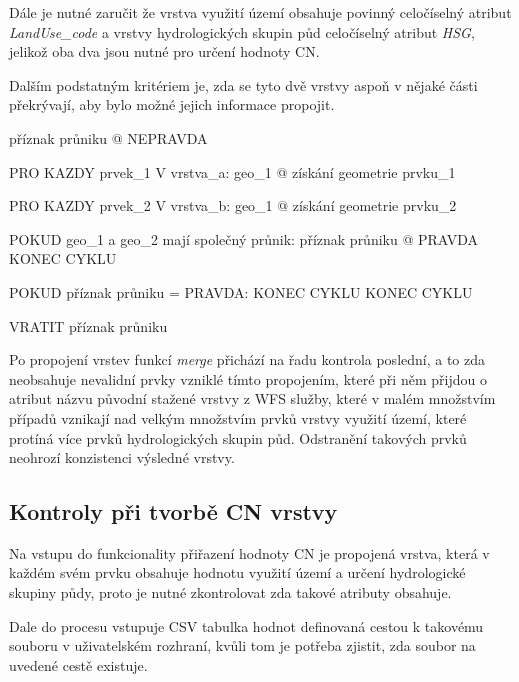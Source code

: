 \documentclass[a4paper,oneside,12pt]{book}
\begin{document}
\hspace{10mm} Dále je nutné zaručit že vrstva využití území obsahuje povinný celočíselný atribut \textit{LandUse\_code} a vrstvy hydrologických skupin půd  celočíselný atribut \textit{HSG}, jelikož oba dva jsou nutné pro určení hodnoty CN.

\hspace{10mm} Dalším podstatným kritériem je, zda se tyto dvě vrstvy aspoň v nějaké části překrývají, aby bylo možné jejich informace propojit.

\begin{pseudocode}[style=mypseudocode, caption={Ukázka kontroly překrytí obou vrstev},label={kod:overlap_check}]
příznak průniku @ NEPRAVDA

PRO KAZDY prvek_1 V vrstva_a:
    geo_1 @ získání geometrie prvku_1

    PRO KAZDY prvek_2 V vrstva_b:
        geo_1 @ získání geometrie prvku_2
        
        POKUD geo_1 a geo_2 mají společný průnik:
            příznak průniku @  PRAVDA
            KONEC CYKLU

    POKUD příznak průniku = PRAVDA:
        KONEC CYKLU
KONEC CYKLU

VRATIT příznak průniku 


\end{pseudocode}

\hspace{10mm} Po propojení vrstev funkcí \textit{merge} přichází na řadu kontrola poslední, a to zda neobsahuje nevalidní prvky vzniklé tímto propojením, které při něm přijdou o atribut názvu původní stažené vrstvy z WFS služby, které v malém množstvím případů vznikají nad velkým množstvím prvků vrstvy využití území, které protíná více prvků hydrologických skupin půd. Odstranění takových prvků neohrozí konzistenci výsledné vrstvy.

\subsection{Kontroly při tvorbě CN vrstvy} \label{CN_checks}
\hspace{10mm} Na vstupu do funkcionality přiřazení hodnoty CN je propojená vrstva, která v každém svém prvku obsahuje hodnotu využití území a určení hydrologické skupiny půdy, proto je nutné zkontrolovat zda takové atributy obsahuje.

\hspace{10mm} Dale do procesu vstupuje CSV tabulka hodnot definovaná cestou k takovému souboru v uživatelském rozhraní, kvůli tom je potřeba zjistit, zda soubor na uvedené cestě existuje.
\end{document}
